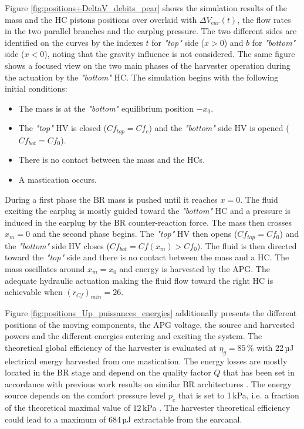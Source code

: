 \documentclass[3p,twocolumn,preprint]{elsarticle}
\begin{document}
Figure \ref{fig:positions+DeltaV_debits_pear} shows the simulation results of the mass and the HC pistons positions over overlaid with $\Delta V_{ear}(t)$, the flow rates in the two parallel branches and the earplug pressure. The two different sides are identified on the curves by the indexes $t$ for \emph{"top"} side ($x>0$) and $b$ for \emph{"bottom"} side ($x<0$), noting that the gravity influence is not considered. The same figure shows a focused view on the two main phases of the harvester operation during the actuation by the \emph{"bottom"} HC. The simulation begins with the following initial conditions:
\begin{itemize}
	\item The mass is at the \emph{"bottom"} equilibrium position $-x_0$.
	\item The \emph{"top"} HV is closed ($Cf_{top} = Cf_c$) and the \emph{"bottom"} side HV is opened ($Cf_{bot} = Cf_0$).
	\item There is no contact between the mass and the HCs.
	\item A mastication occurs.
\end{itemize}

During a first phase the BR mass is pushed until it reaches $x=0$. The fluid exciting the earplug is mostly guided toward the \emph{"bottom"} HC and a pressure is induced in the earplug by the BR counter-reaction force. The mass then crosses $x_m=0$ and the second phase begins. The \emph{"top"} HV then opens ($Cf_{top} = Cf_0$) and the \emph{"bottom"} side HV closes ($Cf_{bot} = Cf(x_m)>Cf_0$). The fluid is then directed toward the \emph{"top"} side and there is no contact between the mass and a HC. The mass oscillates around $x_m=x_0$ and energy is harvested by the APG. The adequate hydraulic actuation making the fluid flow toward the right HC is achievable when \mbox{$(r_{Cf})_{min}=26$}.  

Figure \ref{fig:positions_Up_puissances_energies} additionally presents the different positions of the moving components, the APG voltage, the source and harvested powers and the different energies entering and exciting the system. The theoretical global efficiency of the harvester is evaluated at \mbox{$\eta_g=85$\,\%} with 22\,µJ electrical energy harvested from one mastication. The energy losses are mostly located in the BR stage and depend on the quality factor $Q$ that has been set in accordance with previous work results on similar BR architectures \cite{Liu2013}. The energy source depends on the comfort pressure level $p_c$ that is set to 1\,kPa, i.e. a fraction of the theoretical maximal value of $12$\,kPa \cite{Bouchard-Roy2020}. The harvester theoretical efficiency could lead to a maximum of 684\,µJ extractable from the earcanal.
\end{document}
